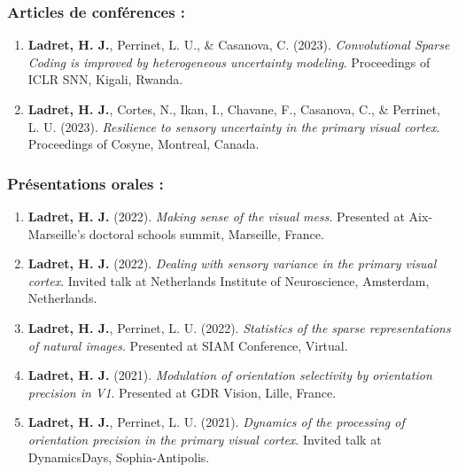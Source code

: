 \subsubsection*{Articles de conférences :}
\begin{enumerate}
\item \textbf{Ladret, H. J.}, Perrinet, L. U., \& Casanova, C. (2023). \textit{Convolutional Sparse Coding is improved by heterogeneous uncertainty modeling}. Proceedings of ICLR SNN, Kigali, Rwanda.
\item \textbf{Ladret, H. J.}, Cortes, N., Ikan, I., Chavane, F., Casanova, C., \& Perrinet, L. U. (2023). \textit{Resilience to sensory uncertainty in the primary visual cortex}. Proceedings of Cosyne, Montreal, Canada. 
\end{enumerate}

\subsubsection*{Présentations orales :}
\begin{enumerate}
\item \textbf{Ladret, H. J.} (2022). \textit{Making sense of the visual mess}. Presented at Aix-Marseille's doctoral schools summit, Marseille, France.
\item \textbf{Ladret, H. J.} (2022). \textit{Dealing with sensory variance in the primary visual cortex}. Invited talk at Netherlands Institute of Neuroscience, Amsterdam, Netherlands.
\item \textbf{Ladret, H. J.}, Perrinet, L. U. (2022). \textit{Statistics of the sparse representations of natural images}. Presented at SIAM Conference, Virtual.
\item \textbf{Ladret, H. J.} (2021). \textit{Modulation of orientation selectivity by orientation precision in V1}. Presented at GDR Vision, Lille, France. 
\item \textbf{Ladret, H. J.}, Perrinet, L. U. (2021). \textit{Dynamics of the processing of orientation precision in the primary visual cortex}. Invited talk at DynamicsDays, Sophia-Antipolis.
\end{enumerate}

